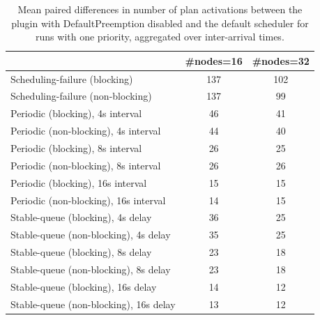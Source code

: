 \begin{table}[t]
\tiny
\setlength{\tabcolsep}{1.2pt}
\renewcommand{\arraystretch}{1.12}
\centering
\caption{Mean paired differences in number of plan activations between the plugin with DefaultPreemption disabled and the default scheduler for runs with one priority, aggregated over inter-arrival times.}
\label{tab:plan_activations-defpreempt0-prio1-std0-agg-arrival}
\begin{tabular}{l c c}
\toprule
 & \#nodes=16 & \#nodes=32 \\
\midrule
Scheduling-failure (blocking) & 137 & 102 \\
Scheduling-failure (non-blocking) & 137 & 99 \\
Periodic (blocking), 4s interval & 46 & 41 \\
Periodic (non-blocking), 4s interval & 44 & 40 \\
Periodic (blocking), 8s interval & 26 & 25 \\
Periodic (non-blocking), 8s interval & 26 & 26 \\
Periodic (blocking), 16s interval & 15 & 15 \\
Periodic (non-blocking), 16s interval & 14 & 15 \\
Stable-queue (blocking), 4s delay & 36 & 25 \\
Stable-queue (non-blocking), 4s delay & 35 & 25 \\
Stable-queue (blocking), 8s delay & 23 & 18 \\
Stable-queue (non-blocking), 8s delay & 23 & 18 \\
Stable-queue (blocking), 16s delay & 14 & 12 \\
Stable-queue (non-blocking), 16s delay & 13 & 12 \\
\bottomrule
\end{tabular}
\end{table}
